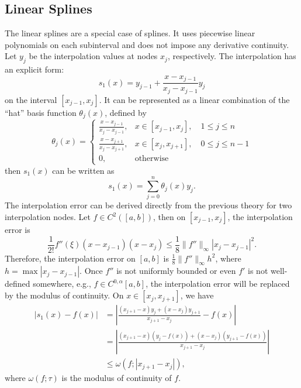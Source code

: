 \subsection{Linear Splines}
The linear splines are a special case of splines. It uses piecewise linear polynomials on each subinterval and does not impose any derivative continuity. Let $y_j$ be the interpolation values at nodes $x_j$, respectively. The interpolation has an explicit form:
\begin{equation}
    s_1(x) = y_{j-1} + \frac{x - x_{j-1}}{x_j - x_{j-1}} y_j
\end{equation}
on the interval $[x_{j-1}, x_j]$. It can be represented as a linear combination of the ``hat'' basis function $\theta_j(x)$, defined by
\begin{equation}
    \theta_j(x) = \begin{cases}
        \frac{x - x_{{j-1}}}{x_j - x_{j-1}}, & x\in [x_{j-1}, x_{j}],\quad 1\le j\le n\\
         \frac{x - x_{j+1}}{x_j - x_{j+1}}, & x\in [x_j, x_{j+1}],\quad 0\le j\le n-1\\
         0, & \text{otherwise}
    \end{cases}
\end{equation}
then $s_1(x)$ can be written as 
$$s_1(x) = \sum_{j=0}^n \theta_j(x) y_j.$$
The interpolation error can be derived directly from the previous theory for two interpolation nodes. Let $f\in C^2([a, b])$, then on $[x_{j-1}, x_j]$, the interpolation error is 
\begin{equation}
    \frac{1}{2!}f''(\xi) (x - x_{j-1})(x - x_j) \le \frac{1}{8} \|f''\|_{\infty} |x_j - x_{j-1}|^2.
\end{equation}
Therefore, the interpolation error on $[a, b]$ is $\frac{1}{8} \|f''\|_{\infty} h^2$, where $h = \max|x_j - x_{j-1}|$. Once $f''$ is not uniformly bounded or even $f'$ is not well-defined somewhere, e.g., $f\in C^{0,\alpha}[a, b]$, the interpolation error will be replaced by the modulus of continuity. On $x\in [x_j, x_{j+1}]$, we have 
\begin{equation}
\begin{aligned}
    |s_1(x) - f(x)| &= \left| \frac{ (x_{j+1} - x) y_j+ (x - x_j) y_{j+1}}{x_{j+1} - x_j} - f(x) \right| \\   
    &=  \left| \frac{ (x_{j+1} - x) (y_j - f(x)) + (x - x_j) (y_{j+1}-f(x))}{x_{j+1} - x_j}  \right| \\ &\le \omega(f; |x_{j+1} - x_j|),
\end{aligned}
\end{equation}
where $\omega(f;\tau)$ is the modulus of continuity of $f$.
